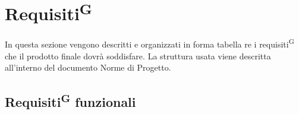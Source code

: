 

\section{Requisiti\textsuperscript{G}}
In questa sezione vengono descritti e organizzati in forma tabella re i requisiti\textsuperscript{G} che il prodotto finale dovrà soddisfare. La struttura usata viene descritta all'interno del documento Norme di Progetto.


\subsection{Requisiti\textsuperscript{G} funzionali}

